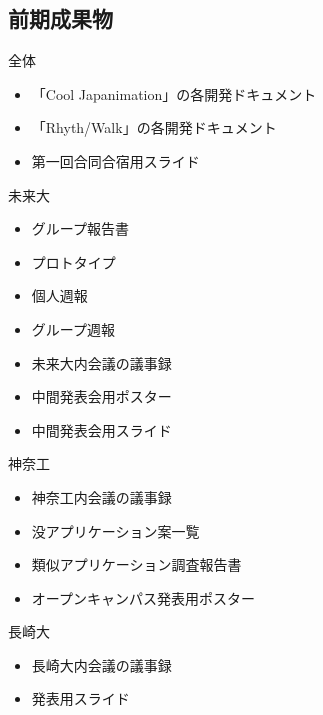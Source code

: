 \subsection{前期成果物}

全体
\begin{itemize}
\item 「Cool Japanimation」の各開発ドキュメント
\item 「Rhyth/Walk」の各開発ドキュメント
\item 第一回合同合宿用スライド
\end{itemize}

未来大
\begin{itemize}
\item グループ報告書
\item プロトタイプ
\item 個人週報
\item グループ週報
\item 未来大内会議の議事録
\item 中間発表会用ポスター
\item 中間発表会用スライド
\end{itemize}

神奈工
\begin{itemize}
\item 神奈工内会議の議事録
\item 没アプリケーション案一覧
\item 類似アプリケーション調査報告書
\item オープンキャンパス発表用ポスター
\end{itemize}

長崎大
\begin{itemize}
\item 長崎大内会議の議事録
\item 発表用スライド
\end{itemize}

